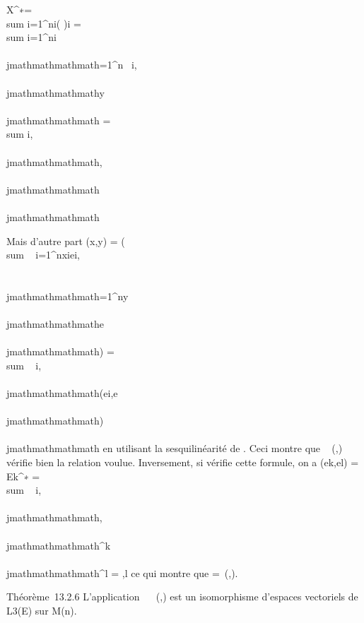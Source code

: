 X^∗\OmegaY = \\sum
i=1^n\overlinex i(\OmegaY
)i = \\sum
i=1^n\overlinex i
\sum \\\\jmathmathmathmath=1^n\omega~
i,\\\\jmathmathmathmathy\\\\jmathmathmathmath = \\sum
i,\\\\jmathmathmathmath\omegai,\\\\jmathmathmathmath\overlinexiy\\\\jmathmathmathmath

Mais d'autre part \phi(x,y) =
\phi(\\sum ~
i=1^nxiei,\\\sum
 \\\\jmathmathmathmath=1^ny\\\\jmathmathmathmathe\\\\jmathmathmathmath)
= \\sum ~
i,\\\\jmathmathmathmath\phi(ei,e\\\\jmathmathmathmath)\overlinexiy\\\\jmathmathmathmath
en utilisant la sesquilinéarité de \phi. Ceci montre que
\mathrmMat~ (\phi,) vérifie
bien la relation voulue. Inversement, si \Omega vérifie cette formule, on a
\phi(ek,el) = Ek^∗\OmegaEl
= \\sum ~
i,\\\\jmathmathmathmath\omegai,\\\\jmathmathmathmath\deltai^k\delta\\\\jmathmathmathmath^l =
\omegak,l ce qui montre que \Omega =\
\mathrmMat (\phi,).

Théorème~13.2.6 L'application
\phi\mapsto~\mathrmMat~
(\phi,) est un isomorphisme d'espaces vectoriels de L3(E) sur
M\mathbb{C}(n).


